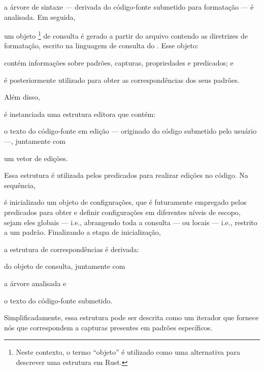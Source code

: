 \documentclass
  [11pt,a4paper,english,brazil,openright,sumario=tradicional,twoside]
  {abntex2}
\begin{document}
  \begin{inparaenum}
    \item a árvore de sintaxe --- derivada do código-fonte submetido para
          formatação --- é analisada. Em seguida,
    \item um objeto%
          \footnote
            { Neste contexto, o termo ``objeto'' é utilizado como uma
              alternativa para descrever uma estrutura em Rust.}
          de consulta é gerado a partir do arquivo contendo as
          diretrizes de formatação, escrito na linguagem de consulta do
          \treesitter. Esse objeto:
          \begin{inparaenum}
            \item contém informações sobre padrões, capturas, propriedades e
                  predicados; e
            \item é posteriormente utilizado para obter as correspondências
                  dos seus padrões.
          \end{inparaenum}

          Além disso,
    \item é instanciada uma estrutura editora que contém:
          \begin{inparaenum}
            \item o texto do código-fonte em edição --- originado do código
                  submetido pelo usuário ---, juntamente com
            \item um vetor de edições.
          \end{inparaenum}
          Essa estrutura é utilizada pelos predicados para realizar edições no
          código. Na sequência,
    \item é inicializado um objeto de configurações, que é futuramente
          empregado pelos predicados para obter e definir configurações em
          diferentes níveis de escopo, sejam eles globais --- i.e., abrangendo
          toda a consulta --- ou locais --- i.e., restrito a um padrão.
          Finalizando a etapa de inicialização,
    \item a estrutura de correspondências é derivada:
          \begin{inparaenum}
            \item do objeto de consulta, juntamente com
            \item a árvore analisada e
            \item o texto do código-fonte submetido.
          \end{inparaenum}
          Simplificadamente, essa estrutura pode ser descrita como um iterador
          que fornece nós que correspondem a capturas presentes em padrões
          específicos.
  \end{inparaenum}
\end{document}
